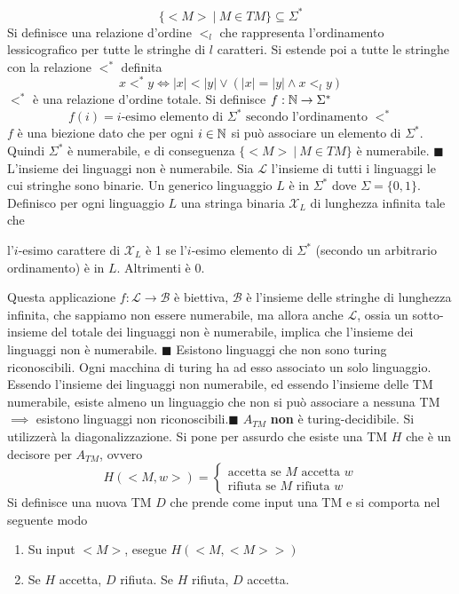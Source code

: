 \documentclass[10pt, letterpaper]{report}
\begin{document}
$$ \{<M>\ |\ M\in TM\}\subseteq \Sigma^*$$
Si definisce una relazione d'ordine $<_l$ che rappresenta l'ordinamento lessicografico per tutte le 
stringhe di $l$ caratteri. Si estende poi  a tutte le stringhe con la relazione $<^*$ definita 
$$ x<^*y\iff 
    |x|<|y| \lor (|x|=|y|\land x<_l y)
$$
$<^*$ è una relazione d'ordine totale. Si definisce $f:{\mathbb N}\rightarrow \Sigma^*$ 
$$ f(i)=i\text{-esimo elemento di $\Sigma^*$ secondo l'ordinamento }<^*$$
$f$ è una biezione dato che per ogni $i\in{\mathbb N}$ si può associare un elemento di $\Sigma^*$. Quindi $\Sigma^*$ è numerabile, e di conseguenza $\{<M>\ |\ M\in TM\}$ è numerabile. \hfill$\blacksquare$\acc 
{} L'insieme dei linguaggi non è numerabile.\acc 
{} Sia $\mathcal{L}$ l'insieme di tutti i linguaggi le cui stringhe sono binarie. Un generico linguaggio $L$ è in $\Sigma^*$ dove $\Sigma=\{0,1\}$. 
Definisco per ogni linguaggio $L$ una stringa binaria $\mathcal{X}_L$ di lunghezza infinita tale che 
\begin{center}
    l'$i$-esimo carattere di $\mathcal{X}_L$ è 1 se l'$i$-esimo elemento di $\Sigma^*$ (secondo un arbitrario ordinamento) è in $L$. Altrimenti è 0. 
\end{center}
Questa applicazione $f:\mathcal{L}\rightarrow\mathcal{B}$ è biettiva, $\mathcal{B}$ è l'insieme delle stringhe di lunghezza infinita, che sappiamo non essere numerabile, ma allora anche $\mathcal{L}$, ossia un sotto-insieme del totale dei linguaggi non è numerabile, implica che l'insieme dei linguaggi non è numerabile. \hfill$\blacksquare$\acc 
{} Esistono linguaggi che non sono turing riconoscibili. \acc 
\dimo{} Ogni macchina di turing ha ad esso associato un solo linguaggio. Essendo l'insieme dei linguaggi non numerabile, ed essendo l'insieme delle TM numerabile, esiste almeno un linguaggio che non si può associare a nessuna TM $\implies$ esistono linguaggi non riconoscibili.\hfill$\blacksquare$\acc 
\teo{} $A_{TM}$ \textbf{non} è turing-decidibile.\acc 
\dimo{} Si utilizzerà la diagonalizzazione. Si pone per assurdo che esiste una TM $H$ che è un decisore per $A_{TM}$, ovvero 
$$ H(<M,w>)=\begin{cases}
    \text{accetta se $M$ accetta $w$}\\ 
    \text{rifiuta se $M$ rifiuta $w$}
\end{cases}$$
Si definisce una nuova TM $D$ che prende come input una TM e si comporta nel seguente modo \begin{enumerate}
    \item Su input $<M>$, esegue $H(<M,<M>>)$
    \item Se $H$ accetta, $D$ rifiuta. Se $H$ rifiuta, $D$ accetta.
\end{enumerate}
\end{document}
